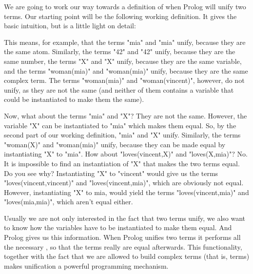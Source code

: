 We are  going to work our way towards a  definition of when
Prolog will unify two terms.  Our starting point will be the following
working definition. It gives the basic intuition, but is a little
light on detail:
%
\begin{center}\parbox{0.9\textwidth}{
}
\end{center}
%
This means, for example, that the terms "mia" and "mia" unify, because
they are the same atom. Similarly, the terms "42" and "42" unify,
because they are the same number, the terms "X" and "X" unify, because
they are the same variable, and the terms "woman(mia)" and
"woman(mia)" unify, because they are the same complex term. The terms
"woman(mia)" and "woman(vincent)", however, do not unify, as they are
not the same (and neither of them contains a variable that could be
instantiated to make them the same).

Now, what about the terms "mia" and "X"? They are not the same.
However, the variable "X" can be instantiated to "mia" which makes
them equal. So, by the second part of our working definition, "mia"
and "X" unify. Similarly, the terms "woman(X)" and "woman(mia)" unify,
because they can be made equal by instantiating "X" to "mia". How
about "loves(vincent,X)" and "loves(X,mia)"? No. It is impossible to
find an instantiation of "X" that makes the two terms equal. Do you
see why?  Instantiating "X" to "vincent" would give us the terms
"loves(vincent,vincent)" and "loves(vincent,mia)", which are obviously
not equal. However, instantiating "X" to mia, would yield the terms
"loves(vincent,mia)" and "loves(mia,mia)", which aren't equal either.

Usually we are not only interested in the fact that two terms unify,
we also want to know how the variables have to be instantiated to make
them equal. And Prolog gives us this information.  When
Prolog unifies two terms it performs all the necessary ,
so that the terms really are equal afterwards. This functionality,
together with the fact that we are allowed to build complex terms
(that is,  terms) makes unification a
powerful programming mechanism.

